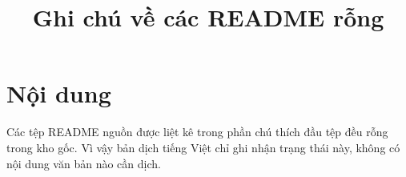 \documentclass[11pt]{article}
\title{Ghi chú về các README rỗng}
\author{}
\date{}
\begin{document}
\maketitle

\section*{Nội dung}

Các tệp README nguồn được liệt kê trong phần chú thích đầu tệp đều rỗng trong
kho gốc. Vì vậy bản dịch tiếng Việt chỉ ghi nhận trạng thái này, không có nội
dung văn bản nào cần dịch.
\end{document}
